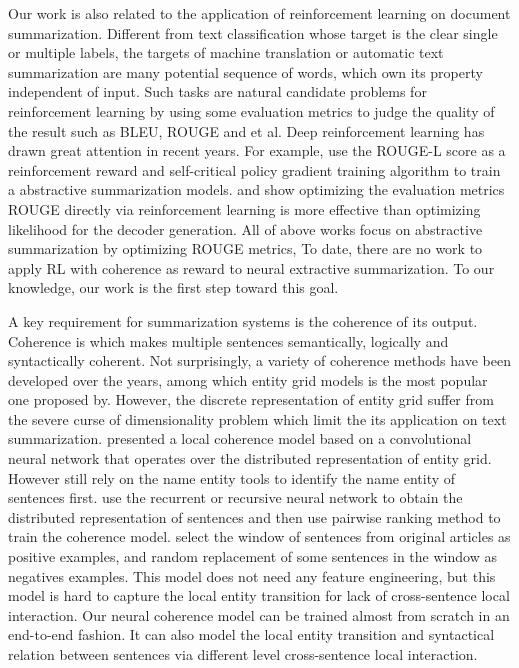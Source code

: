 \documentclass[letterpaper]{article} %
\begin{document}
	Our work is also related to the application of reinforcement learning on document summarization. Different from text classification whose target is the clear single or multiple labels, the targets of machine translation or automatic text summarization are many potential sequence of words, which own its property independent of input. Such tasks are natural candidate problems for reinforcement learning by using some evaluation metrics to judge the quality of the result such as BLEU, ROUGE and et al. Deep reinforcement learning has drawn great attention in recent years. For example, \cite{socher2017_summarization} use the ROUGE-L score as a reinforcement reward and self-critical policy gradient training algorithm to train a abstractive summarization models. \cite{ayana2016} and \cite{sltrnn2016} show optimizing the evaluation metrics ROUGE directly via reinforcement learning is more effective than optimizing likelihood for the decoder generation. All of above works focus on abstractive summarization by optimizing ROUGE metrics, To date, there are no work to apply RL with coherence as reward to neural extractive summarization. To our knowledge, our work is the first step toward this goal.
	
	
	A key requirement for summarization systems is the coherence of its output. Coherence is which makes multiple sentences semantically, logically and syntactically coherent\cite{Yao2017RecentAI}. Not surprisingly, a variety of coherence methods have been developed over the years\cite{Yao2017RecentAI}, among which entity grid models is the most popular one proposed by\cite{entitygrid}. However, the discrete representation of entity grid suffer from the severe curse of dimensionality problem which limit the its application on text summarization. \cite{nlcm} presented a local coherence model based on a convolutional neural network that operates over the distributed representation of entity grid. However \cite{nlcm} still rely on the name entity tools to identify the name entity of sentences first. \cite{jiweili2014}  use the recurrent or recursive neural network to obtain the distributed representation of sentences and then use pairwise ranking method to train the coherence model. \cite{jiweili2014} select the window of sentences from original articles as positive examples, and random replacement of some sentences in the window as negatives examples. This model does not need any feature engineering, but this model is hard to capture the local entity transition for lack of cross-sentence local interaction. Our neural coherence model can be trained almost from scratch in an end-to-end fashion. It can also model the local entity transition and syntactical relation between sentences via different level cross-sentence local interaction. 
\end{document}
